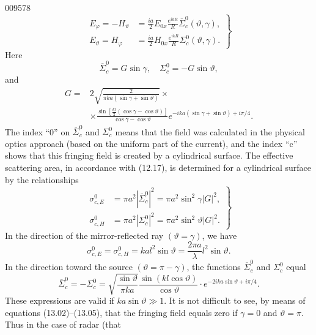 \begin{scanpage}{0095}{78}
\[\left.\begin{aligned}E_\varphi=-H_\vartheta&=\frac{ia}2E_{0x}\frac{e^{ikR}}R\overline\Sigma_c^0(\vartheta,\gamma),\\E_\vartheta=H_\varphi&=\frac{ia}2H_{0x}\frac{e^{ikR}}R\Sigma_c^0(\vartheta,\gamma).\end{aligned}\right\}\tag{13.20}\]
Here
\[\overline\Sigma_c^0=G\sin\gamma,\quad\Sigma_c^0=-G\sin\vartheta,\tag{13.21}\]
and
\[\begin{aligned}G={}&2\sqrt{\frac2{\pi ka(\sin\gamma+\sin\vartheta)}}\times\\&\times\frac{\sin[\frac{kl}2(\cos\gamma-\cos\vartheta)]}{\cos\gamma-\cos\vartheta}e^{-ika(\sin\gamma+\sin\vartheta)+i\pi/4}.\end{aligned}\tag{13.22}\]
The index ``0'' on $\overline\Sigma_c^0$ and $\Sigma_c^0$ means that the field was calculated in the physical optics approach (based on the uniform part of the current), and the index ``c'' shows that this fringing field is created by a cylindrical surface. The effective scattering area, in accordance with (12.17), is determined for a cylindrical surface by the relationships
\[\left.\begin{aligned}\sigma_{c,E}^0&=\pi a^2|\overline\Sigma_c^0|^2=\pi a^2\sin^2\gamma|G|^2,\\\sigma_{c,H}^0&=\pi a^2|\Sigma_c^0|^2=\pi a^2\sin^2\vartheta|G|^2.\end{aligned}\right\}\tag{13.23}\]
In the direction of the mirror-reflected ray $(\vartheta=\gamma)$, we have
\[\sigma_{c,E}^0=\sigma_{c,H}^0=kal^2\sin\vartheta=\frac{2\pi a}\lambda l^2\sin\vartheta.\tag{13.24}\]
In the direction toward the source $(\vartheta=\pi-\gamma)$, the functions $\overline\Sigma_c^0$ and $\Sigma_c^0$ equal
\[\overline\Sigma_c^0=-\Sigma_c^0=\sqrt{\frac{\sin\vartheta}{\pi ka}}\frac{\sin(kl\cos\vartheta)}{\cos\vartheta}\cdot e^{-2ika\sin\vartheta+i\pi/4}.\tag{13.25}\]
These expressions are valid if $ka\sin\vartheta\gg1$. It is not difficult to see, by means of equations (13.02)--(13.05), that the fringing field equals zero if $\gamma=0$ and $\vartheta=\pi$. Thus in the case of radar (that
\end{scanpage}
